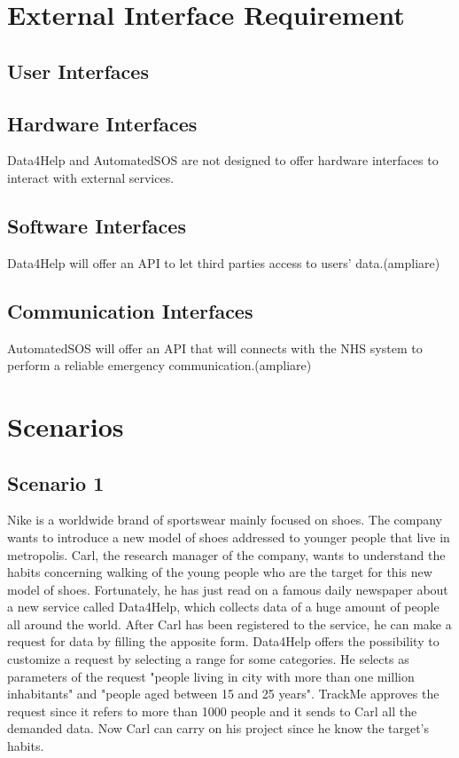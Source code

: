 \section{External Interface Requirement}
\subsection{User Interfaces}
\par
\par
\par
\par
\par
\subsection{Hardware Interfaces}
Data4Help and AutomatedSOS are not designed to offer hardware interfaces to interact with external services.
\subsection{Software Interfaces}
Data4Help will offer an API to let third parties access to users' data.(ampliare)
\subsection{Communication Interfaces}
AutomatedSOS will offer an API that will connects with the NHS system to perform a reliable emergency communication.(ampliare)

\section{Scenarios}
    \subsection{Scenario 1}
    Nike is a worldwide brand of sportswear mainly focused on shoes. The company wants to introduce a new model of shoes addressed to younger people that live in metropolis. Carl, the research manager of the company, wants to understand the habits concerning walking of the young people who are the target for this new model of shoes.
    Fortunately, he has just read on a famous daily newspaper about a new service called Data4Help, which collects data of a huge amount of people all around the world. After Carl has been registered to the service, he can make a request for data by filling the apposite form. Data4Help offers the possibility to customize a request by selecting a range for some categories. He selects as parameters of the request "people living in city with more than one million inhabitants" and "people aged between 15 and 25 years".
    TrackMe approves the request since it refers to more than 1000 people and it sends to Carl all the demanded data.
    Now Carl can carry on his project since he know the target's habits.

